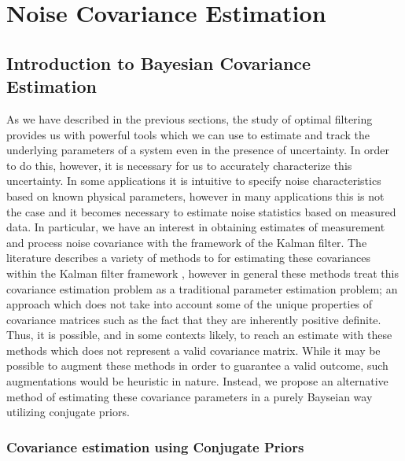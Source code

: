 \documentclass[11pt]{article}
\begin{document}
\section{Noise Covariance Estimation}

\subsection{Introduction to Bayesian Covariance Estimation}

As we have described in the previous sections, the study of optimal filtering provides us with powerful tools which we can use to estimate and track the underlying parameters of a system even in the presence of uncertainty. In order to do this, however, it is necessary for us to accurately characterize this uncertainty. In some applications it is intuitive to specify noise characteristics based on known physical parameters, however in many applications this is not the case and it becomes necessary to estimate noise statistics based on measured data. In particular, we have an interest in obtaining estimates of measurement and process noise covariance with the framework of the Kalman filter. The literature describes a variety of methods to for estimating these covariances within the Kalman filter framework \cite{Dunik17a}, however in general these methods treat this covariance estimation problem as a traditional parameter estimation problem; an approach which does not take into account some of the unique properties of covariance matrices such as the fact that they are inherently positive definite. Thus, it is possible, and in some contexts likely, to reach an estimate with these methods which does not represent a valid covariance matrix. While it may be possible to augment these methods in order to guarantee a valid outcome, such augmentations would be heuristic in nature. Instead, we propose an alternative method of estimating these covariance parameters in a purely Bayseian way utilizing conjugate priors.

\subsubsection{Covariance estimation using Conjugate Priors}
\end{document}
